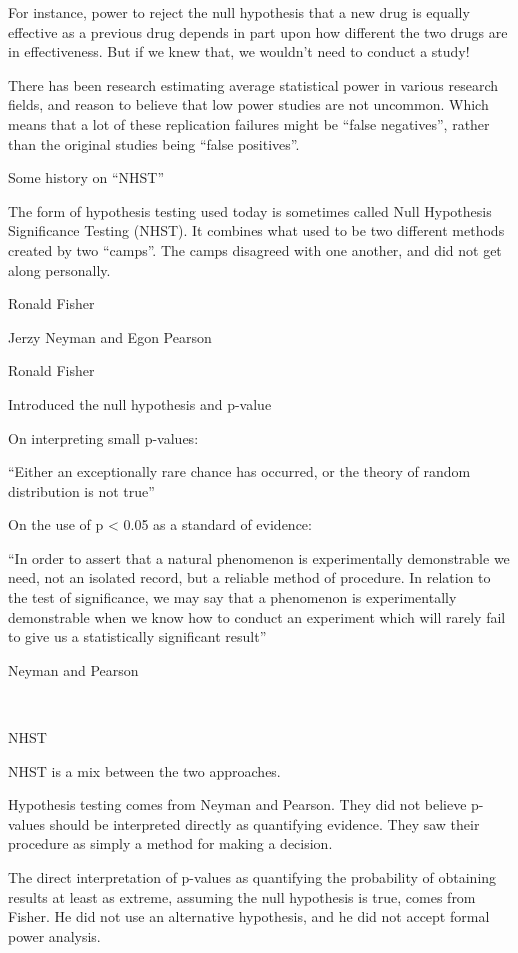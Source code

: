 \documentclass[
  letterpaper,
  DIV=11,
  numbers=noendperiod]{scrreprt}
\begin{document}
For instance, power to reject the null hypothesis that a new drug is
equally effective as a previous drug depends in part upon how different
the two drugs are in effectiveness. But if we knew that, we wouldn't
need to conduct a study!

There has been research estimating average statistical power in various
research fields, and reason to believe that low power studies are not
uncommon. Which means that a lot of these replication failures might be
``false negatives'', rather than the original studies being ``false
positives''.

Some history on ``NHST''

The form of hypothesis testing used today is sometimes called Null
Hypothesis Significance Testing (NHST). It combines what used to be two
different methods created by two ``camps''. The camps disagreed with one
another, and did not get along personally.

Ronald Fisher

Jerzy Neyman and Egon Pearson

Ronald Fisher

Introduced the null hypothesis and p-value

On interpreting small p-values:

``Either an exceptionally rare chance has occurred, or the theory of
random distribution is not true''~

On the use of p \textless{} 0.05 as a standard of evidence:

``In order to assert that a natural phenomenon is experimentally
demonstrable we need, not an isolated record, but a reliable method of
procedure. In relation to the test of significance, we may say that a
phenomenon is experimentally demonstrable when we know how to conduct an
experiment which will rarely fail to give us a statistically significant
result''

Neyman and Pearson

~

NHST

NHST is a mix between the two approaches.

Hypothesis testing comes from Neyman and Pearson. They did not believe
p-values should be interpreted directly as quantifying evidence. They
saw their procedure as simply a method for making a decision.

The direct interpretation of p-values as quantifying the probability of
obtaining results at least as extreme, assuming the null hypothesis is
true, comes from Fisher. He did not use an alternative hypothesis, and
he did not accept formal power analysis.
\end{document}
